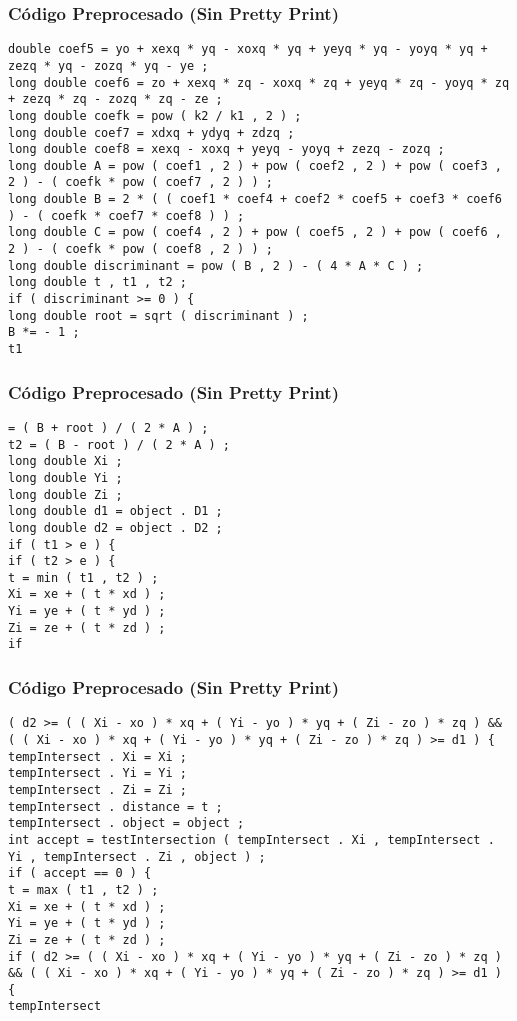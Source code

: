 \documentclass{beamer}
\begin{document}
\begin{frame}[fragile]
\frametitle{C\'odigo Preprocesado (Sin Pretty Print)}
\begin{lstlisting}[style=CStyle]
double coef5 = yo + xexq * yq - xoxq * yq + yeyq * yq - yoyq * yq + zezq * yq - zozq * yq - ye ; 
long double coef6 = zo + xexq * zq - xoxq * zq + yeyq * zq - yoyq * zq + zezq * zq - zozq * zq - ze ; 
long double coefk = pow ( k2 / k1 , 2 ) ; 
long double coef7 = xdxq + ydyq + zdzq ; 
long double coef8 = xexq - xoxq + yeyq - yoyq + zezq - zozq ; 
long double A = pow ( coef1 , 2 ) + pow ( coef2 , 2 ) + pow ( coef3 , 2 ) - ( coefk * pow ( coef7 , 2 ) ) ; 
long double B = 2 * ( ( coef1 * coef4 + coef2 * coef5 + coef3 * coef6 ) - ( coefk * coef7 * coef8 ) ) ; 
long double C = pow ( coef4 , 2 ) + pow ( coef5 , 2 ) + pow ( coef6 , 2 ) - ( coefk * pow ( coef8 , 2 ) ) ; 
long double discriminant = pow ( B , 2 ) - ( 4 * A * C ) ; 
long double t , t1 , t2 ; 
if ( discriminant >= 0 ) { 
long double root = sqrt ( discriminant ) ; 
B *= - 1 ; 
t1 \end{lstlisting}
\end{frame}
\begin{frame}[fragile]
\frametitle{C\'odigo Preprocesado (Sin Pretty Print)}
\begin{lstlisting}[style=CStyle]
= ( B + root ) / ( 2 * A ) ; 
t2 = ( B - root ) / ( 2 * A ) ; 
long double Xi ; 
long double Yi ; 
long double Zi ; 
long double d1 = object . D1 ; 
long double d2 = object . D2 ; 
if ( t1 > e ) { 
if ( t2 > e ) { 
t = min ( t1 , t2 ) ; 
Xi = xe + ( t * xd ) ; 
Yi = ye + ( t * yd ) ; 
Zi = ze + ( t * zd ) ; 
if \end{lstlisting}
\end{frame}
\begin{frame}[fragile]
\frametitle{C\'odigo Preprocesado (Sin Pretty Print)}
\begin{lstlisting}[style=CStyle]
( d2 >= ( ( Xi - xo ) * xq + ( Yi - yo ) * yq + ( Zi - zo ) * zq ) && ( ( Xi - xo ) * xq + ( Yi - yo ) * yq + ( Zi - zo ) * zq ) >= d1 ) { 
tempIntersect . Xi = Xi ; 
tempIntersect . Yi = Yi ; 
tempIntersect . Zi = Zi ; 
tempIntersect . distance = t ; 
tempIntersect . object = object ; 
int accept = testIntersection ( tempIntersect . Xi , tempIntersect . Yi , tempIntersect . Zi , object ) ; 
if ( accept == 0 ) { 
t = max ( t1 , t2 ) ; 
Xi = xe + ( t * xd ) ; 
Yi = ye + ( t * yd ) ; 
Zi = ze + ( t * zd ) ; 
if ( d2 >= ( ( Xi - xo ) * xq + ( Yi - yo ) * yq + ( Zi - zo ) * zq ) && ( ( Xi - xo ) * xq + ( Yi - yo ) * yq + ( Zi - zo ) * zq ) >= d1 ) { 
tempIntersect \end{lstlisting}
\end{frame}
\end{document}
